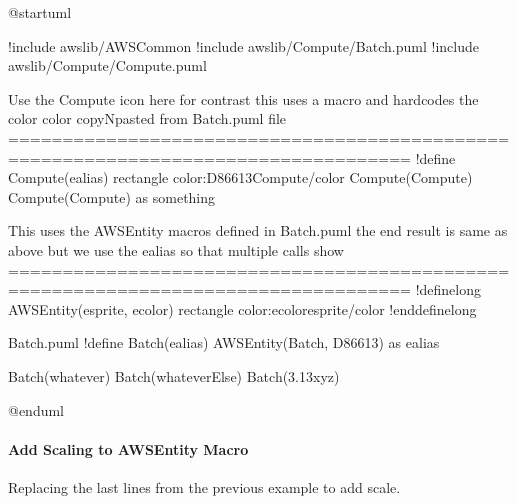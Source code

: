 \documentclass[letterpaper,10pt,english]{sphinxmanual}
\begin{document}
%
\begin{sphinxVerbatim}[commandchars=\\\{\},numbers=left,firstnumber=1,stepnumber=1]
@startuml 

!include \PYGZlt{}awslib/AWSCommon\PYGZgt{}
!include \PYGZlt{}awslib/Compute/Batch.puml\PYGZgt{}
!include \PYGZlt{}awslib/Compute/Compute.puml\PYGZgt{}



\PYGZsq{}Use the Compute icon here for contrast
\PYGZsq{}this uses a macro \PYGZhy{} and hardcodes the color \PYGZhy{} color copyNpasted from Batch.puml file
\PYGZsq{}===================================================================================
!define Compute(e\PYGZus{}alias) rectangle \PYGZdq{}\PYGZlt{}color:\PYGZsh{}D86613\PYGZgt{}\PYGZlt{}\PYGZdl{}Compute\PYGZgt{}\PYGZlt{}/color\PYGZgt{}\PYGZdq{}  
Compute(Compute) 
Compute(Compute) as something


\PYGZsq{} This uses the AWSEntity macros defined in Batch.puml
\PYGZsq{} the end result is same as above \PYGZhy{} but we use the e\PYGZus{}alias so that multiple calls show
\PYGZsq{}===================================================================================
!definelong AWSEntity(e\PYGZus{}sprite, e\PYGZus{}color)
rectangle \PYGZdq{}\PYGZlt{}color:e\PYGZus{}color\PYGZgt{}\PYGZlt{}\PYGZdl{}e\PYGZus{}sprite\PYGZgt{}\PYGZlt{}/color\PYGZgt{}\PYGZdq{} 
!enddefinelong

\PYGZsq{} Batch.puml
!define Batch(e\PYGZus{}alias) AWSEntity(Batch, \PYGZsh{}D86613) as e\PYGZus{}alias

Batch(whatever)
Batch(whateverElse) 
Batch(3.13xyz) 


@enduml
\end{sphinxVerbatim}
\sphinxresetverbatimhllines


\paragraph{Add Scaling to AWSEntity Macro}
\label{\detokenize{StdlibUnderTheHood/StdlibUnderstanding:add-scaling-to-awsentity-macro}}
Replacing the last lines from the previous example to add scale.

\begin{figure}[htbp]
\centering

\end{figure}
\end{document}
